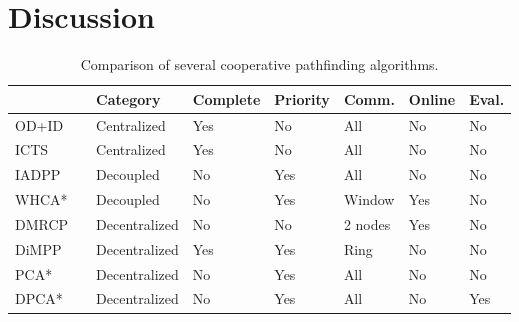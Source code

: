 \section{Discussion}\label{sec:discussion}
\begin{table*}[h]
    \centering
    \caption{Comparison of several cooperative pathfinding algorithms.}
    \label{tbl:planning-overview}
    \begin{tabular}{ll|l|l|l|l|l|l}
        & & Category & Complete & Priority & Comm. & Online & Eval. \\
        \hline
        OD+ID & \cite{standley2010,standley2011} & Centralized & Yes & No &
        All &
        No & No \\
        ICTS & \cite{sharon2013} & Centralized & Yes & No & All & No & No\\
        IADPP & \cite{cap2012} & Decoupled & No & Yes & All & No & No \\
        WHCA* & \cite{silver2005} & Decoupled & No & Yes & Window & Yes & No \\
        DMRCP & \cite{wei2016} & Decentralized & No & No & 2 nodes & Yes & No
        \\
        DiMPP & \cite{chouhan2017} & Decentralized & Yes & Yes & Ring & No & 
        No
        \\ \hline
        PCA* & & Decentralized & No & Yes & All & No & No \\
        DPCA* & & Decentralized & No & Yes & All & No & Yes
    \end{tabular}
\end{table*}





